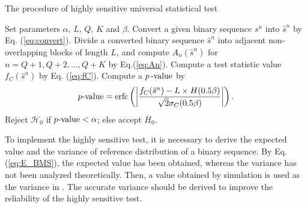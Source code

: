 %
\begin{algorithm}[h]
\caption{The procedure of highly sensitive universal statistical test}
\label{alg:highly}
\begin{algorithmic}[1]
\State Set parameters $\alpha,\,L,\, Q,\,K$ and $\beta$.
\State Convert a given binary sequence $s^n$ into $\hat{s}^n$ by Eq. (\ref{eq:convert}).
\State Divide a converted binary sequence $\hat{s}^n$ into adjacent non-overlapping blocks of length $L$, and compute $A_n(\hat{s}^n)$ for $n=Q+1,Q+2,\dots,Q+K$ by Eq.(\ref{eq:An}). \label{state:divide}
\State Compute a test statistic value $f_C(\hat{s}^n)$ by Eq. (\ref{eq:fC}).
\State Compute a $p \, \mathchar`- \mathrm{value}$ by
\begin{align}
	 p\mathchar`- \mathrm{value} = \mathrm{erfc} \left( \left| \frac{f_C(\hat{s}^n) - L\times H(0.5\beta)}{\sqrt{2} \sigma_C(0.5\beta)} \right| \right).
\end{align}
\State Reject $\mathcal{H}_0$ if $p\mathchar`- \mathrm{value} < \alpha$; else accept $\overline{H}_0$.
\end{algorithmic}
\end{algorithm}
%
\par
%
To implement the highly sensitive test, it is necessary to derive the expected value and the variance of reference distribution of a binary sequence.
%
By Eq. (\ref{eq:E_BMS}), the expected value has been obtained, whereas the variance has not been analyzed theoretically. Then, a value obtained by simulation is used as the variance in \cite{yamamoto2016highly}. The accurate variance should be derived to improve the reliability of the highly sensitive test.
